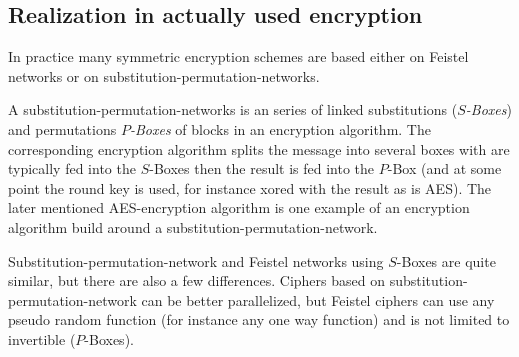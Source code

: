 \subsection{Realization in actually used encryption}
 In practice many symmetric encryption schemes are based either on Feistel networks or on substitution-permutation-networks. 
 \begin{definition}
  A substitution-permutation-networks is an series of linked substitutions (\emph{$S$-Boxes}) and permutations \emph{$P$-Boxes} of blocks in an encryption algorithm. The corresponding encryption algorithm splits the message into several boxes with are typically fed into the $S$-Boxes then the result is fed into the $P$-Box (and at some point the round key is used, for instance xored with the result as is AES). The later mentioned AES-encryption algorithm is one example of an encryption algorithm build around a substitution-permutation-network.
 \end{definition}
 Substitution-permutation-network and Feistel networks using $S$-Boxes are quite similar, but there are also a few differences. Ciphers based on substitution-permutation-network can be better parallelized, but Feistel ciphers can use any pseudo random function (for instance any one way function) and is not limited to invertible ($P$-Boxes). %
